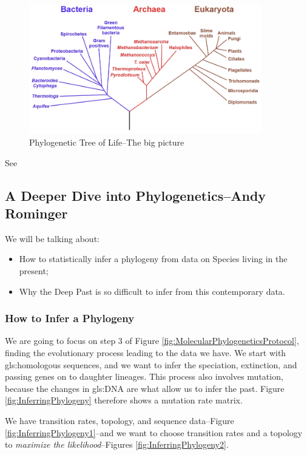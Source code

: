 \documentclass[]{article}
\begin{document}
\begin{figure}[H]
	\caption[Phylogenetic Tree of Life--The big picture]{Phylogenetic Tree of Life--The big picture\cite{wiki:tol:biology}}
	\label{flg:the:big:picture}
	\includegraphics[width=0.9\textwidth]{TOL5}
\end{figure}

See \cite{hillis1996molecular,zuckerkandl1965molecules,williams2006assessing,woese2002evolution}

\subsection[A Deeper Dive into Phylogenetics]{A Deeper Dive into Phylogenetics--Andy Rominger}

We will be talking about:
\begin{itemize}
	\item How to statistically infer a phylogeny from data on Species living in the present;
	\item Why the Deep Past is so difficult to infer from this contemporary data.
\end{itemize}

\subsubsection{How to Infer a Phylogeny}
We are going to focus on step 3 of Figure \ref{fig:MolecularPhylogeneticsProtocol}, finding the evolutionary process leading to the data we have. We start with \gls{gls:homologous} sequences, and we want to infer the speciation, extinction, and passing genes on to daughter lineages. This process also involves mutation, because the changes in \gls{gls:DNA} are what allow us to infer the past. Figure  \ref{fig:InferringPhylogeny} therefore shows a mutation rate matrix. 

We have transition rates, topology, and sequence data--Figure \ref{fig:InferringPhylogeny1}--and we want to choose transition rates and a topology to \textit{maximize the likelihood}--Figures \ref{fig:InferringPhylogeny2}. 
\end{document}
